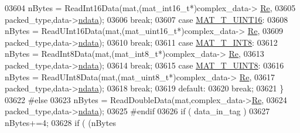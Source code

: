 \begin{DoxyCode}
{{{{{{{{{{{{{{{{{{03604                             nBytes = ReadInt16Data(mat,(mat\_int16\_t*)complex\_data->
      \hyperlink{group___m_a_t_a484a93607508adac2bce53a0252e0325}{Re},
03605                                 packed\_type,data->\hyperlink{group___m_a_t_a1beb8a8c58a808207cbea650563a9b63}{ndata});
03606                             \textcolor{keywordflow}{break};
03607                         \textcolor{keywordflow}{case} \hyperlink{group___m_a_t_ggacf7b3b879282b7ab3a51190e49bf3453a05bc7af7680aa68be95126ae0a4c2e31}{MAT\_T\_UINT16}:
03608                             nBytes = ReadUInt16Data(mat,(mat\_uint16\_t*)complex\_data->
      \hyperlink{group___m_a_t_a484a93607508adac2bce53a0252e0325}{Re},
03609                                 packed\_type,data->\hyperlink{group___m_a_t_a1beb8a8c58a808207cbea650563a9b63}{ndata});
03610                             \textcolor{keywordflow}{break};
03611                         \textcolor{keywordflow}{case} \hyperlink{group___m_a_t_ggacf7b3b879282b7ab3a51190e49bf3453a9807f5033ed4f9b548953742d9fd1658}{MAT\_T\_INT8}:
03612                             nBytes = ReadInt8Data(mat,(mat\_int8\_t*)complex\_data->
      \hyperlink{group___m_a_t_a484a93607508adac2bce53a0252e0325}{Re},
03613                                 packed\_type,data->\hyperlink{group___m_a_t_a1beb8a8c58a808207cbea650563a9b63}{ndata});
03614                             \textcolor{keywordflow}{break};
03615                         \textcolor{keywordflow}{case} \hyperlink{group___m_a_t_ggacf7b3b879282b7ab3a51190e49bf3453a01c1bd7db68f90552862eb5d311be408}{MAT\_T\_UINT8}:
03616                             nBytes = ReadUInt8Data(mat,(mat\_uint8\_t*)complex\_data->
      \hyperlink{group___m_a_t_a484a93607508adac2bce53a0252e0325}{Re},
03617                                 packed\_type,data->\hyperlink{group___m_a_t_a1beb8a8c58a808207cbea650563a9b63}{ndata});
03618                             \textcolor{keywordflow}{break};
03619                         \textcolor{keywordflow}{default}:
03620                             \textcolor{keywordflow}{break};
03621                     \}
03622 \textcolor{preprocessor}{#else}
03623                     nBytes = ReadDoubleData(mat,complex\_data->\hyperlink{group___m_a_t_a484a93607508adac2bce53a0252e0325}{Re},
03624                                  packed\_type,data->\hyperlink{group___m_a_t_a1beb8a8c58a808207cbea650563a9b63}{ndata});
03625 \textcolor{preprocessor}{#endif}
03626                     \textcolor{keywordflow}{if} ( data\_in\_tag )
03627                         nBytes+=4;
03628                     \textcolor{keywordflow}{if} ( (nBytes %
}}}}}}}}}}}}}}}}}}
\end{DoxyCode}
